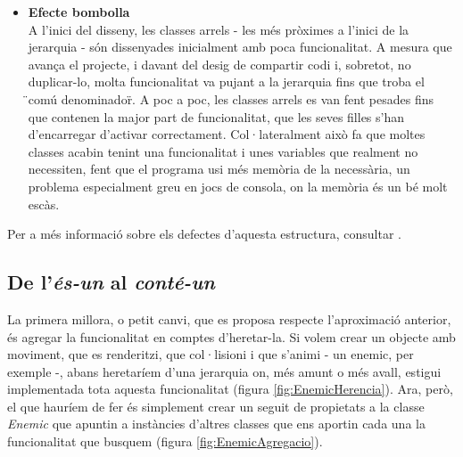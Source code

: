\begin{itemize}
\begin{enumerate}
    \end{enumerate}
  \item {\bf Efecte bombolla} \hfill \\
    A l'inici del disseny, les classes arrels - les més pròximes a l'inici de la jerarquia - són dissenyades inicialment amb poca funcionalitat. A mesura que avança el projecte, i davant del desig de compartir codi i, sobretot, no duplicar-lo, molta funcionalitat va pujant a la jerarquia fins que troba el \"{}comú denominador\"{}. A poc a poc, les classes arrels es van fent pesades fins que contenen la major part de funcionalitat, que les seves filles s'han d'encarregar d'activar correctament. Col·lateralment això fa que moltes classes acabin tenint una funcionalitat i unes variables que realment no necessiten, fent que el programa usi més memòria de la necessària, un problema especialment greu en jocs de consola, on la memòria és un bé molt escàs.
    
\end{itemize}

Per a més informació sobre els defectes d'aquesta estructura, consultar \cite{Wilson02}.

\subsection{De l'{\em és-un} al {\em conté-un}}


La primera millora, o petit canvi, que es proposa respecte l'aproximació anterior, és agregar la funcionalitat en comptes d'heretar-la. Si volem crear un objecte amb moviment, que es renderitzi, que col·lisioni i que s'animi - un enemic, per exemple -, abans heretaríem d'una jerarquia on, més amunt o més avall, estigui implementada tota aquesta funcionalitat (figura \ref{fig:EnemicHerencia}). Ara, però, el que hauríem de fer és simplement crear un seguit de propietats a la classe {\em Enemic} que apuntin a instàncies d'altres classes que ens aportin cada una la funcionalitat que busquem (figura \ref{fig:EnemicAgregacio}).

